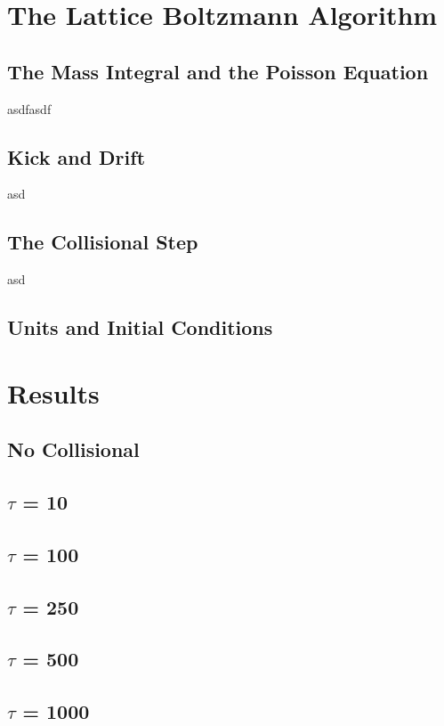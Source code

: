 \chapter{The Lattice Boltzmann Algorithm}
\section{The Mass Integral and the Poisson Equation}
asdfasdf
\section{Kick and Drift}
asd
\section{The Collisional Step}
asd
\section{Units and Initial Conditions}

\chapter{Results}
\section{No Collisional}
\section{$\tau$ = 10}
\section{$\tau$ = 100}
\section{$\tau$ = 250}
\section{$\tau$ = 500}
\section{$\tau$ = 1000}
